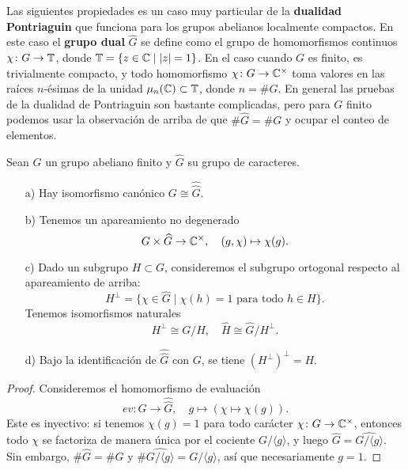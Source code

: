 Las siguientes propiedades es un caso muy particular de la
\textbf{dualidad Pontriaguin} que funciona para los grupos abelianos localmente
compactos. En este caso el \textbf{grupo dual} $\widehat{G}$ se define como el
grupo de homomorfismos continuos $\chi\colon G\to \mathbb{T}$, donde
$\mathbb{T} = \{ z \in \mathbb{C} \mid |z| = 1 \}$. En el caso cuando $G$ es finito, es
trivialmente compacto, y todo homomorfismo $\chi\colon G\to \mathbb{C}^\times$ toma
valores en las raíces $n$-ésimas de la unidad $\mu_n (\mathbb{C}) \subset \mathbb{T}$,
donde $n = \# G$. En general las pruebas de la dualidad de Pontriaguin
son bastante complicadas, pero para $G$ finito podemos usar
la observación de arriba de que $\#\widehat{G} = \# G$ y ocupar el conteo
de elementos.

\begin{proposicion}
  Sean $G$ un grupo abeliano finito y $\widehat{G}$ su grupo de caracteres.

  \begin{enumerate}
  \item[a)] Hay isomorfismo canónico $G \cong \widehat{\widehat{G}}$.

  \item[b)] Tenemos un apareamiento no degenerado
    \[ G\times \widehat{G} \to \mathbb{C}^\times, \quad
       (g,\chi) \mapsto \chi (g). \]

  \item[c)] Dado un subgrupo $H \subset G$, consideremos el subgrupo ortogonal
    respecto al apareamiento de arriba:
    $$H^\perp = \{ \chi \in \widehat{G} \mid \chi (h) = 1 \text{ para todo } h\in H \}.$$
    Tenemos isomorfismos naturales
    \[ H^\perp \cong \widehat{G/H}, \quad \widehat{H} \cong \widehat{G}/H^\perp. \]

  \item[d)] Bajo la identificación de $\widehat{\widehat{G}}$ con $G$, se tiene
    $(H^\perp)^\perp = H$.
  \end{enumerate}

  \begin{proof}
    Consideremos el homomorfismo de evaluación
    \[ ev\colon G \to \widehat{\widehat{G}}, \quad
    g \mapsto (\chi \mapsto \chi (g)). \]
    Este es inyectivo: si tenemos $\chi (g) = 1$ para todo carácter
    $\chi\colon G \to \mathbb{C}^\times$, entonces todo $\chi$ se factoriza de manera
    única por el cociente $G/\langle g\rangle$, y luego
    $\widehat{G} = \widehat{G/\langle g\rangle}$. Sin embargo,
    $\#\widehat{G} = \# G$ y
    $\#\widehat{G/\langle g\rangle} = G/\langle g\rangle$, así que
    necesariamente $g = 1$.


\end{proof}
\end{proposicion}

